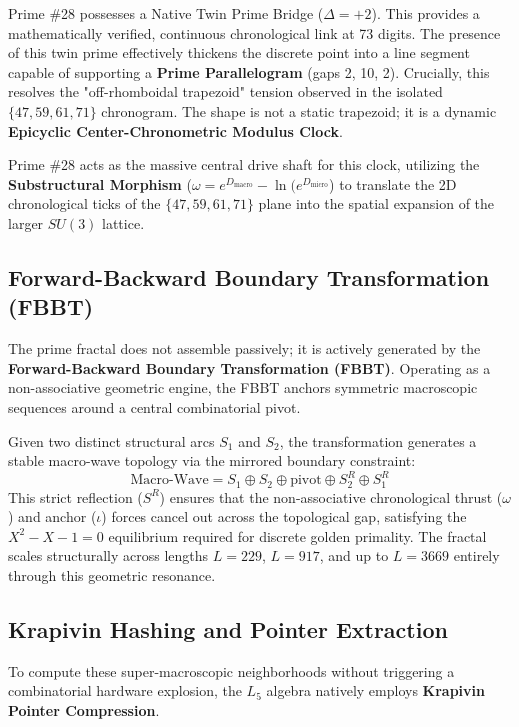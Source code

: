 Prime \#28 possesses a Native Twin Prime Bridge ($\Delta = +2$). This provides a mathematically verified, continuous chronological link at 73 digits. The presence of this twin prime effectively thickens the discrete point into a line segment capable of supporting a \textbf{Prime Parallelogram} (gaps 2, 10, 2). Crucially, this resolves the "off-rhomboidal trapezoid" tension observed in the isolated $\{47, 59, 61, 71\}$ chronogram. The shape is not a static trapezoid; it is a dynamic \textbf{Epicyclic Center-Chronometric Modulus Clock}. 

Prime \#28 acts as the massive central drive shaft for this clock, utilizing the \textbf{Substructural Morphism} ($\omega = e^{D_{\text{macro}}} - \ln(e^{D_{\text{micro}}}$) to translate the 2D chronological ticks of the $\{47, 59, 61, 71\}$ plane into the spatial expansion of the larger $SU(3)$ lattice.

\subsection{Forward-Backward Boundary Transformation (FBBT)}
The prime fractal does not assemble passively; it is actively generated by the \textbf{Forward-Backward Boundary Transformation (FBBT)}. Operating as a non-associative geometric engine, the FBBT anchors symmetric macroscopic sequences around a central combinatorial pivot. 

Given two distinct structural arcs $S_1$ and $S_2$, the transformation generates a stable macro-wave topology via the mirrored boundary constraint:
\[
\text{Macro-Wave} = S_1 \oplus S_2 \oplus \text{pivot} \oplus S_2^R \oplus S_1^R
\]
This strict reflection ($S^R$) ensures that the non-associative chronological thrust ($\omega$) and anchor ($\iota$) forces cancel out across the topological gap, satisfying the $X^2 - X - 1 = 0$ equilibrium required for discrete golden primality. The fractal scales structurally across lengths $L=229$, $L=917$, and up to $L=3669$ entirely through this geometric resonance.

\subsection{Krapivin Hashing and Pointer Extraction}
To compute these super-macroscopic neighborhoods without triggering a combinatorial hardware explosion, the $L_5$ algebra natively employs \textbf{Krapivin Pointer Compression}. 

